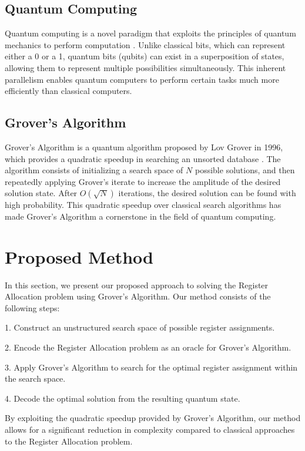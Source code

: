 \subsection{Quantum Computing}

Quantum computing is a novel paradigm that exploits the principles of quantum mechanics to perform computation \cite{quantum_computing}. Unlike classical bits, which can represent either a 0 or a 1, quantum bits (qubits) can exist in a superposition of states, allowing them to represent multiple possibilities simultaneously. This inherent parallelism enables quantum computers to perform certain tasks much more efficiently than classical computers.

\subsection{Grover's Algorithm}

Grover's Algorithm is a quantum algorithm proposed by Lov Grover in 1996, which provides a quadratic speedup in searching an unsorted database \cite{grover}. The algorithm consists of initializing a search space of $N$ possible solutions, and then repeatedly applying Grover's iterate to increase the amplitude of the desired solution state. After $O(\sqrt{N})$ iterations, the desired solution can be found with high probability. This quadratic speedup over classical search algorithms has made Grover's Algorithm a cornerstone in the field of quantum computing.

\section{Proposed Method} \label{sec:method}

In this section, we present our proposed approach to solving the Register Allocation problem using Grover's Algorithm. Our method consists of the following steps:

1. Construct an unstructured search space of possible register assignments.

2. Encode the Register Allocation problem as an oracle for Grover's Algorithm.

3. Apply Grover's Algorithm to search for the optimal register assignment within the search space.

4. Decode the optimal solution from the resulting quantum state.

By exploiting the quadratic speedup provided by Grover's Algorithm, our method allows for a significant reduction in complexity compared to classical approaches to the Register Allocation problem.

